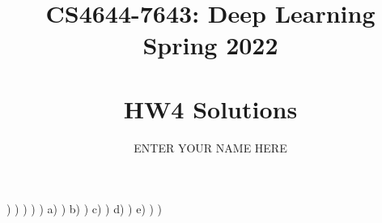 \documentclass[11pt,english]{article}
\begin{document}
\title{CS4644-7643: Deep Learning\\
Spring 2022 \\
\\ HW4 Solutions}
\author{ENTER YOUR NAME HERE}
\maketitle

)
)
)
)
) a)
) b)
) c)
) d)
) e)
)
)
\newpage

\end{document}
